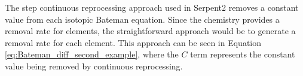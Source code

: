 






The step continuous reprocessing approach used in Serpent2 removes a constant value from each isotopic Bateman equation. Since the chemistry provides a removal rate for elements, the straightforward approach would be to generate a removal rate for each element. This approach can be seen in Equation \ref{eq:Bateman_diff_second_example}, where the $C$ term represents the constant value being removed by continuous reprocessing.

